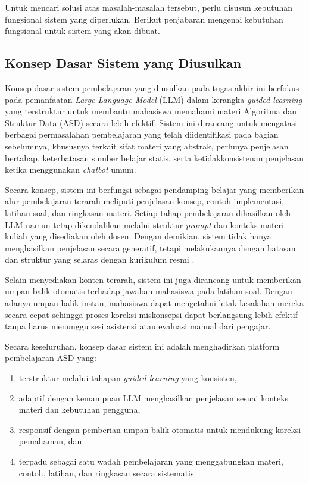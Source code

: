 Untuk mencari solusi atas masalah-masalah tersebut, perlu disusun kebutuhan fungsional sistem yang diperlukan. Berikut penjabaran mengenai kebutuhan fungsional untuk sistem yang akan dibuat.


\subsection{Konsep Dasar Sistem yang Diusulkan}

Konsep dasar sistem pembelajaran yang diusulkan pada tugas akhir ini berfokus pada pemanfaatan \textit{Large Language Model} (LLM) dalam kerangka \textit{guided learning} yang terstruktur untuk membantu mahasiswa memahami materi Algoritma dan Struktur Data (ASD) secara lebih efektif. Sistem ini dirancang untuk mengatasi berbagai permasalahan pembelajaran yang telah diidentifikasi pada bagian sebelumnya, khususnya terkait sifat materi yang abstrak, perlunya penjelasan bertahap, keterbatasan sumber belajar statis, serta ketidakkonsistenan penjelasan ketika menggunakan \textit{chatbot} umum.

Secara konsep, sistem ini berfungsi sebagai pendamping belajar yang memberikan alur pembelajaran terarah meliputi penjelasan konsep, contoh implementasi, latihan soal, dan ringkasan materi. Setiap tahap pembelajaran dihasilkan oleh LLM namun tetap dikendalikan melalui struktur \textit{prompt} dan konteks materi kuliah yang disediakan oleh dosen. Dengan demikian, sistem tidak hanya menghasilkan penjelasan secara generatif, tetapi melakukannya dengan batasan dan struktur yang selaras dengan kurikulum resmi \autocite{Minaee2025PromptEngineering}.

Selain menyediakan konten terarah, sistem ini juga dirancang untuk memberikan umpan balik otomatis terhadap jawaban mahasiswa pada latihan soal. Dengan adanya umpan balik instan, mahasiswa dapat mengetahui letak kesalahan mereka secara cepat sehingga proses koreksi miskonsepsi dapat berlangsung lebih efektif tanpa harus menunggu sesi asistensi atau evaluasi manual dari pengajar.

Secara keseluruhan, konsep dasar sistem ini adalah menghadirkan platform pembelajaran ASD yang:

\begin{enumerate}
    \item terstruktur melalui tahapan \textit{guided learning} yang konsisten,
    \item adaptif dengan kemampuan LLM menghasilkan penjelasan sesuai konteks materi dan kebutuhan pengguna,
    \item responsif dengan pemberian umpan balik otomatis untuk mendukung koreksi pemahaman, dan
    \item terpadu sebagai satu wadah pembelajaran yang menggabungkan materi, contoh, latihan, dan ringkasan secara sistematis.
\end{enumerate}


